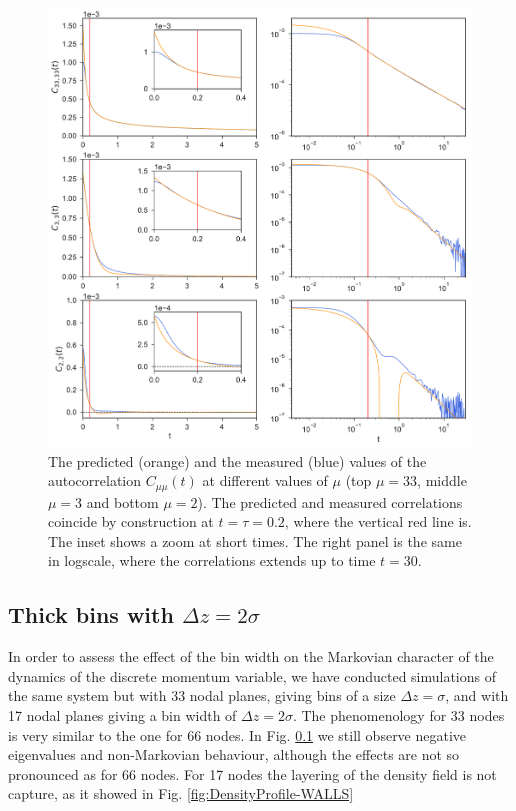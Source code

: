 \documentclass[b5paper,openright,11pt]{book}
\newcommand{\Pendiente}[1]{{\color{green}#1}} %
\begin{document}
\begin{figure}[h!]
  \centering
\includegraphics[width=\linewidth]{Predictions-WALLS-66nodes}
\caption[Predicted autocorrelations of $C(t)$ for 66 nodes.]{The predicted (orange) and the measured (blue) values of the autocorrelation $C_{\mu\mu}(t)$ at different values of $\mu$ (top $\mu=33$, middle $\mu=3$ and bottom $\mu=2$). The predicted and measured correlations coincide by construction at $t=\tau=0.2$, where the vertical red line is. The inset shows a zoom at short times. The right panel is the same in logscale, where the correlations extends up to time $t=30$.}
\label{fig:Predictions-WALLS-66nodes}
\end{figure}

\subsection{Thick bins with $\Delta z = 2\sigma$}
In  order to  assess the  effect  of the  bin width  on the  Markovian
character of the  dynamics of the discrete momentum  variable, we have
conducted simulations  of the  same system but  with 33  nodal planes,
giving bins  of a  size $\Delta  z=\sigma$, and  with 17  nodal planes
giving a  bin width of  $\Delta z=2\sigma$.  The phenomenology  for 33
nodes  is very  similar to  the one  for 66  nodes.  
\Pendiente{In Fig. \ref{} we still observe negative eigenvalues and non-Markovian behaviour, although the effects are not so pronounced as for 66 nodes.}  
For 17 nodes the layering of the density field is not capture, as it showed in Fig. \ref{fig:DensityProfile-WALLS}
\end{document}
